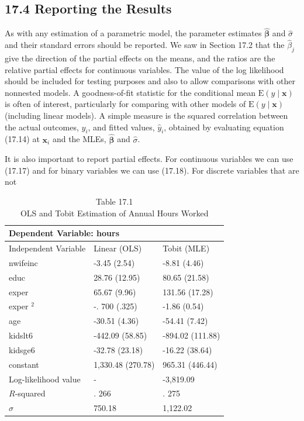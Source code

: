 \documentclass[10pt]{article}
\begin{document}
\subsection*{17.4 Reporting the Results}
As with any estimation of a parametric model, the parameter estimates $\hat{\boldsymbol{\beta}}$ and $\hat{\sigma}$ and their standard errors should be reported. We saw in Section 17.2 that the $\hat{\beta}_{j}$ give the direction of the partial effects on the means, and the ratios are the relative partial effects for continuous variables. The value of the log likelihood should be included for testing purposes and also to allow comparisons with other nonnested models. A goodness-of-fit statistic for the conditional mean $\mathrm{E}(y \mid \mathbf{x})$ is often of interest, particularly for comparing with other models of $\mathrm{E}(y \mid \mathbf{x})$ (including linear models). A simple measure is the squared correlation between the actual outcomes, $y_{i}$, and fitted values, $\hat{y}_{i}$, obtained by evaluating equation (17.14) at $\mathbf{x}_{i}$ and the MLEs, $\hat{\boldsymbol{\beta}}$ and $\hat{\sigma}$.

It is also important to report partial effects. For continuous variables we can use (17.17) and for binary variables we can use (17.18). For discrete variables that are not

\begin{table}[h]
\begin{center}
\captionsetup{labelformat=empty}
\caption{Table 17.1\\
OLS and Tobit Estimation of Annual Hours Worked}
\begin{tabular}{|l|l|l|}
\hline
\multicolumn{3}{|l|}{Dependent Variable: hours} \\
\hline
Independent Variable & Linear (OLS) & Tobit (MLE) \\
\hline
nwifeinc & -3.45 (2.54) & -8.81 (4.46) \\
\hline
educ & 28.76 (12.95) & 80.65 (21.58) \\
\hline
exper & 65.67 (9.96) & 131.56 (17.28) \\
\hline
exper ${ }^{2}$ & -. 700 (.325) & -1.86 (0.54) \\
\hline
age & -30.51 (4.36) & -54.41 (7.42) \\
\hline
kidslt6 & -442.09 (58.85) & -894.02 (111.88) \\
\hline
kidsge6 & -32.78 (23.18) & -16.22 (38.64) \\
\hline
constant & 1,330.48 (270.78) & 965.31 (446.44) \\
\hline
Log-likelihood value & - & -3,819.09 \\
\hline
$R$-squared & . 266 & . 275 \\
\hline
$\hat{\sigma}$ & 750.18 & 1,122.02 \\
\hline
\end{tabular}
\end{center}
\end{table}
\end{document}
